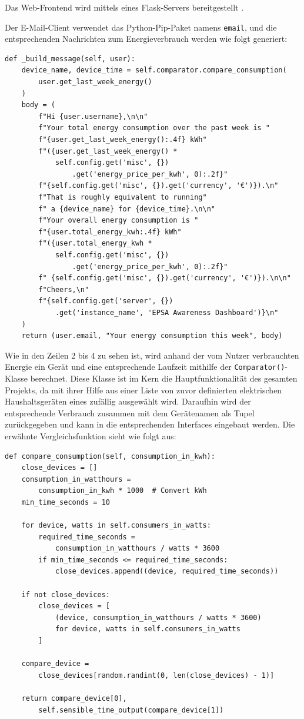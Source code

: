 \documentclass[paper=a4, fontsize=11pt]{scrartcl} %
\numberwithin{equation}{section} %
\numberwithin{figure}{section} %
\numberwithin{table}{section} %
\begin{document}
Das Web-Frontend wird mittels eines Flask-Servers bereitgestellt \cite{flaskdoc}.

Der E-Mail-Client verwendet das Python-Pip-Paket namens \texttt{email}, und die entsprechenden Nachrichten zum Energieverbrauch werden wie folgt generiert:
\begin{verbatim}
def _build_message(self, user):
    device_name, device_time = self.comparator.compare_consumption(
        user.get_last_week_energy()
    )
    body = (
        f"Hi {user.username},\n\n"
        f"Your total energy consumption over the past week is "
        f"{user.get_last_week_energy():.4f} kWh"
        f"({user.get_last_week_energy() * 
            self.config.get('misc', {})
                .get('energy_price_per_kwh', 0):.2f}" 
        f"{self.config.get('misc', {}).get('currency', '€')}).\n"
        f"That is roughly equivalent to running"
        f" a {device_name} for {device_time}.\n\n"
        f"Your overall energy consumption is "
        f"{user.total_energy_kwh:.4f} kWh"
        f"({user.total_energy_kwh * 
            self.config.get('misc', {})
                .get('energy_price_per_kwh', 0):.2f}"
        f" {self.config.get('misc', {}).get('currency', '€')}).\n\n"
        f"Cheers,\n"
        f"{self.config.get('server', {})
            .get('instance_name', 'EPSA Awareness Dashboard')}\n"
    )
    return (user.email, "Your energy consumption this week", body)
\end{verbatim}
Wie in den Zeilen 2 bis 4 zu sehen ist, wird anhand der vom Nutzer verbrauchten Energie ein Gerät und eine entsprechende Laufzeit mithilfe der \texttt{Comparator()}-Klasse berechnet. Diese Klasse ist im Kern die Hauptfunktionalität des gesamten Projekts, da mit ihrer Hilfe aus einer Liste von zuvor definierten elektrischen Haushaltsgeräten eines zufällig ausgewählt wird. Daraufhin wird der entsprechende Verbrauch zusammen mit dem Gerätenamen als Tupel zurückgegeben und kann in die entsprechenden Interfaces eingebaut werden. Die erwähnte Vergleichsfunktion sieht wie folgt aus:
\begin{verbatim}
def compare_consumption(self, consumption_in_kwh):
    close_devices = []
    consumption_in_watthours = 
        consumption_in_kwh * 1000  # Convert kWh
    min_time_seconds = 10

    for device, watts in self.consumers_in_watts:
        required_time_seconds = 
            consumption_in_watthours / watts * 3600
        if min_time_seconds <= required_time_seconds:
            close_devices.append((device, required_time_seconds))

    if not close_devices:
        close_devices = [
            (device, consumption_in_watthours / watts * 3600)
            for device, watts in self.consumers_in_watts
        ]

    compare_device = 
        close_devices[random.randint(0, len(close_devices) - 1)]

    return compare_device[0], 
        self.sensible_time_output(compare_device[1])
\end{verbatim}
\end{document}
